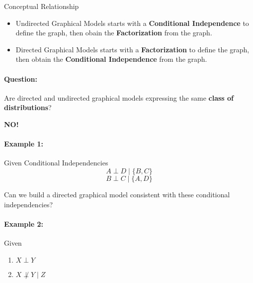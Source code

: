 \documentclass{article}%
\begin{document}
Conceptual Relationship
\begin{itemize}
    \item Undirected Graphical Models starts with a \textbf{Conditional Independence} to define the graph, then obain the \textbf{Factorization} from the graph.
    \item Directed Graphical Models starts with a \textbf{Factorization} to define the graph, then obtain the \textbf{Conditional Independence} from the graph.
\end{itemize}

\paragraph{Question:}
Are directed and undirected graphical models expressing the same \textbf{class of distributions}?

\textbf{NO!}

\paragraph{Example 1:}Given Conditional Independencies
\[
A \perp D \mid \{B, C\}
\]
\[
B \perp C \mid \{A, D\}
\] 
\begin{center}
\end{center}
Can we build a directed graphical model consistent with these conditional independencies?


\paragraph{Example 2:} Given 
\begin{enumerate}
    \item \( X \perp Y \)
    \item \( X \not\perp Y \mid Z \)
\end{enumerate}
\begin{center}
\end{center}
\end{document}
